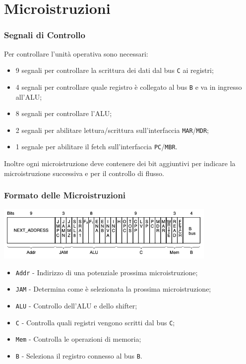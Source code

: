 \documentclass{beamer}
\begin{document}
\section{Microistruzioni}
\begin{frame}
  \frametitle{Segnali di Controllo}
  Per controllare l'unità operativa sono necessari:
  \begin{itemize}
    \item 9 segnali per controllare la scrittura dei dati dal bus \lstinline{C}
    ai registri;
    \item 4 segnali per controllare quale registro è collegato al bus
    \lstinline{B} e va in ingresso all'ALU;
    \item 8 segnali per controllare l'ALU;
    \item 2 segnali per abilitare lettura/scrittura sull'interfaccia
    \lstinline{MAR}/\lstinline{MDR};
    \item 1 segnale per abilitare il fetch sull'interfaccia
    \lstinline{PC}/\lstinline{MBR}.
  \end{itemize}
  Inoltre ogni microistruzione deve contenere dei bit aggiuntivi per indicare la
  microistruzione successiva e per il controllo di flusso.
\end{frame}

\begin{frame}
  \frametitle{Formato delle Microistruzioni}
  \begin{center}
    \includegraphics[width=0.8\textwidth]{mu_instr_small.png}
  \end{center}
\begin{itemize}
  \item \lstinline{Addr} - Indirizzo di una potenziale prossima microistruzione;
  \item \lstinline{JAM} - Determina come è selezionata la prossima
  microistruzione;
  \item \lstinline{ALU} - Controllo dell'ALU e dello shifter;
  \item \lstinline{C} - Controlla quali registri vengono scritti dal bus
  \lstinline{C};
  \item \lstinline{Mem} - Controlla le operazioni di memoria;
  \item \lstinline{B} - Seleziona il registro connesso al bus \lstinline{B}.
\end{itemize}
\end{frame}
\end{document}
